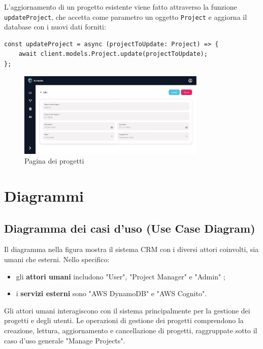 \documentclass[target=bach,aauheader=,style=]{thud}
\begin{document}
\noindent L'aggiornamento di un progetto esistente viene fatto attraverso la funzione \texttt{updateProject}, che accetta come parametro un oggetto \texttt{Project} e aggiorna il database con i nuovi dati forniti:

\begin{lstlisting}[caption=funzione \texttt{updateProject}]
const updateProject = async (projectToUpdate: Project) => {
    await client.models.Project.update(projectToUpdate);
};
\end{lstlisting}

\begin{figure}[H]
    \centering
    \includegraphics[width=0.8\textwidth]{img/interfacce/table_edit.pdf} 
    \caption{Pagina dei progetti}
\end{figure}

\section{Diagrammi}
\subsection{Diagramma dei casi d'uso (Use Case Diagram)}
Il diagramma nella figura mostra il sistema CRM con i diversi attori coinvolti, sia umani che esterni. Nello specifico:

\begin{itemize}
    \item gli \textbf{attori umani} includono "User", "Project Manager" e "Admin" ;
    \item i \textbf{servizi esterni} sono "AWS DynamoDB" e "AWS Cognito".
\end{itemize}

\noindent Gli attori umani interagiscono con il sistema principalmente per la gestione dei progetti e degli utenti. Le operazioni di gestione dei progetti comprendono la creazione, lettura, aggiornamento e cancellazione di progetti, raggruppate sotto il caso d'uso generale "Manage Projects". 
\end{document}
